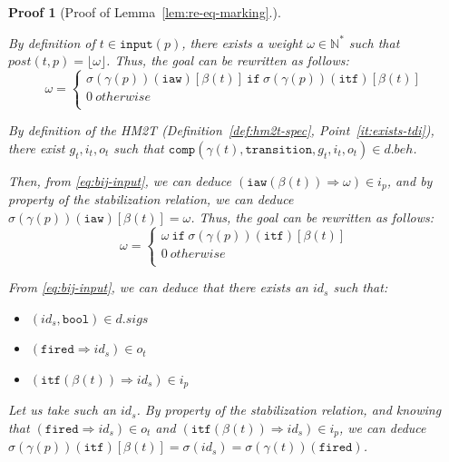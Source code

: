 \documentclass[pdflatex,sn-mathphys]{sn-jnl}%
\theoremstyle{thmstyleone}%
\theoremstyle{thmstyletwo}%
\newtheorem*{pf}{Proof}%
\theoremstyle{thmstylethree}%
\begin{document}
\begin{pf}[Proof of Lemma~\ref{lem:re-eq-marking}.]
\begin{itemize}
\begin{enumerate}
      \noindent{}By definition of $t\in{}\mathtt{input}(p)$, there
      exists a weight $\omega\in\mathbb{N}^{*}$ such that
      $post(t,p)=\lfloor\omega\rfloor$.  Thus, the goal can be
      rewritten as follows:     
      \begin{equation*}
        \boxed{\omega=
          \begin{cases}
            \sigma(\gamma(p))(\texttt{iaw})[\beta(t)]~\mathtt{if}~\sigma(\gamma(p))(\texttt{itf})[\beta(t)]~ \\
            0~otherwise \\
          \end{cases}}
      \end{equation*}

     By definition of the HM2T (Definition~\ref{def:hm2t-spec},
     Point~\ref{it:exists-tdi}), there exist $g_t,i_t,o_t$ such that
     $\mathtt{comp}(\gamma(t),\mathtt{transition}, g_t, i_t,
     o_t)\in{}d.beh$. 
     
     Then, from \eqref{eq:bij-input}, we can deduce
     $(\mathtt{iaw}(\beta(t))\Rightarrow{}\omega)\in{}i_p$, and by
     property of the stabilization relation, we can deduce
     $\sigma(\gamma(p))(\texttt{iaw})[\beta(t)]=\omega$. Thus, the goal
     can be rewritten as follows:
     \begin{equation*}
       \boxed{\omega=
       \begin{cases}
         \omega~\mathtt{if}~\sigma(\gamma(p))(\texttt{itf})[\beta(t)]~ \\
         0~otherwise \\
       \end{cases}}
     \end{equation*}
     
     From \eqref{eq:bij-input}, we can deduce that there exists an
     $id_s$ such that:
     \begin{itemize}
     \item $(id_s,\mathtt{bool})\in{}d.sigs$
     \item $(\mathtt{fired}\Rightarrow{}id_s)\in{}o_t$
     \item $(\mathtt{itf}(\beta(t))\Rightarrow{}id_s)\in{}i_p$
     \end{itemize}
     
     Let us take such an $id_s$. By property of the stabilization
     relation, and knowing that
     $(\mathtt{fired}\Rightarrow{}id_s)\in{}o_t$ and
     $(\mathtt{itf}(\beta(t))\Rightarrow{}id_s)\in{}i_p$, we can deduce
     $\sigma(\gamma(p))(\texttt{itf})[\beta(t)]=\sigma(id_s)=\sigma(\gamma(t))(\texttt{fired})$.


\end{enumerate}
\end{itemize}
\end{pf}
\end{document}

